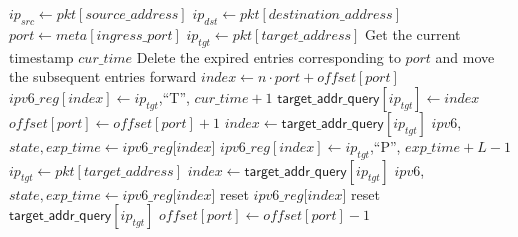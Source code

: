 \documentclass[a4paper,fleqn]{cas-dc}
\begin{document}
\begin{algorithm}[!t]
\begin{algorithmic}[1]
            \State $ip_{src} \gets pkt[source\_address]$
            \State $ip_{dst} \gets pkt[destination\_address]$
            \State $port \gets meta[ingress\_port]$
                \State $ip_{tgt} \gets pkt[target\_address]$
                \State Get the current timestamp $cur\_time$
                        \State Delete the expired entries corresponding to $port$ and move the subsequent entries forward
                        \State $index \gets n \cdot port + of\!fset[port]$
                        \State $ipv6\_reg[index] \gets ip_{tgt}$,``T'', $cur\_time + 1$
                        \State $\mathsf{target\_addr\_query}[ip_{tgt}] \gets index$
                        \State $offset[port] \gets offset[port] + 1$
                    \EndIf
                \Else
                    \State $index \gets \mathsf{target\_addr\_query}[ip_{tgt}]$
                    \State $ipv6$, $state, exp\_time \gets ipv6\_reg$[$index$]
                        \State $ipv6\_reg[index]\!\gets\!ip_{tgt}$,``P'', \!$exp\_time +\! L -\! 1$
                    \EndIf
                \EndIf
                    \State $ip_{tgt} \gets pkt[target\_address]$ 
                        \State $index \gets \mathsf{target\_addr\_query}[ip_{tgt}]$
                        \State $ipv6$, $state, exp\_time \gets ipv6\_reg$[$index$]
                            \State reset $ipv6\_reg$[$index$]
                            \State reset $\mathsf{target\_addr\_query}[ip_{tgt}]$
                            \State $offset[port] \gets offset[port] - 1$
                        \EndIf
                    \EndIf
                \EndIf
            \EndIf
            \end{algorithmic}
        \end{algorithm}
\end{document}
